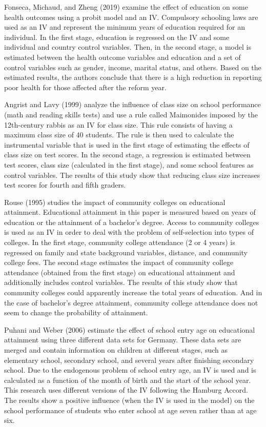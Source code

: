 \documentclass{article}
\begin{document}
Fonseca, Michaud, and Zheng (2019) examine the effect of education on some health outcomes using a probit model and an IV. Compulsory schooling laws are used as an IV and represent the minimum years of education required for an individual. In the first stage, education is regressed on the IV and some individual and country control variables. Then, in the second stage, a model is estimated between the health outcome variables and education and a set of control variables such as gender, income, marital status, and others. Based on the estimated results, the authors conclude that there is a high reduction in reporting poor health for those affected after the reform year. 

Angrist and Lavy (1999) analyze the influence of class size on school performance (math and reading skills tests) and use a rule called Maimonides imposed by the 12th-century rabbis as an IV for class size. This rule consists of having a maximum class size of 40 students. The rule is then used to calculate the instrumental variable that is used in the first stage of estimating the effects of class size on test scores. In the second stage, a regression is estimated between test scores, class size (calculated in the first stage), and some school features as control variables. The results of this study show that reducing class size increases test scores for fourth and fifth graders.

Rouse (1995) studies the impact of community colleges on educational attainment. Educational attainment in this paper is measured based on years of education or the attainment of a bachelor's degree. Access to community colleges is used as an IV in order to deal with the problem of self-selection into types of colleges.
In the first stage, community college attendance (2 or 4 years) is regressed on family and state background variables, distance, and community college fees. The second stage estimates the impact of community college attendance (obtained from the first stage) on educational attainment and additionally includes control variables. The results of this study show that community colleges could apparently increase the total years of education. And in the case of bachelor's degree attainment, community college attendance does not seem to change the probability of attainment.

Puhani and Weber (2006) estimate the effect of school entry age on educational attainment using three different data sets for Germany. These data sets are merged and contain information on children at different stages, such as elementary school, secondary school, and several years after finishing secondary school. Due to the endogenous problem of school entry age, an IV is used and is calculated as a function of the month of birth and the start of the school year. This research uses different versions of the IV following the Hamburg Accord. The results show a positive influence (when the IV is used in the model) on the school performance of students who enter school at age seven rather than at age six.
\end{document}
